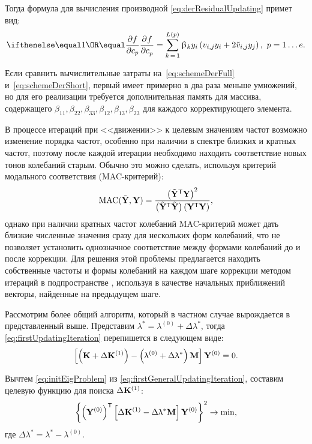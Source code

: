 Тогда формула для вычисления производной \eqref{eq:derResidualUpdating} примет вид:
\begin{equation}
	\partDer{f}{c_p}{} = \sum\limits_{k\,=\,1} ^ {L(p)} \beta_k y_i \rbrackets{v_{i, j} y_i + 2 \tilde{v}_{i, j} y_j}, \ p = 1 \hdots e.
	\label{eq:schemeDerShort}
\end{equation}

Если сравнить вычислительные затраты на~\eqref{eq:schemeDerFull} и~\eqref{eq:schemeDerShort}, первый имеет примерно в два раза меньше умножений, но для его реализации требуется дополнительная память для массива, содержащего $ \beta_{11}, \beta_{22}, \beta_{33}, \beta_{12}, \beta_{13}, \beta_{23} $ для каждого корректирующего элемента. 

В процессе итераций при <<движении>> к целевым значениям частот возможно изменение порядка частот, особенно при наличии в спектре близких и кратных частот, поэтому после каждой итерации необходимо находить соответствие новых тонов колебаний старым. Обычно это можно сделать, используя критерий модального соответствия (MAC-критерий):
\begin{equation}
	\text{MAC}(\tilde{\mathbf{Y}}, \mathbf{Y}) = \frac{\left( \tilde{\mathbf{Y}} ^ \mathsf{T} \mathbf{Y} \right) ^ 2}{\left( \tilde{\mathbf{Y}} ^ \mathsf{T} \tilde{\mathbf{Y}} \right) \left( \mathbf{Y} ^ \mathsf{T} \mathbf{Y} \right)},
	\label{eq:MAC}
\end{equation}
однако при наличии кратных частот колебаний MAC-критерий может дать близкие численные значения сразу для нескольких форм колебаний, что не позволяет установить однозначное соответствие между формами колебаний до и после коррекции. Для решения этой проблемы предлагается находить собственные частоты и формы колебаний на каждом шаге коррекции методом итераций в подпространстве \cite{lib:modelUpdating:Bathe}, используя в качестве начальных приближений векторы, найденные на предыдущем шаге.

Рассмотрим более общий алгоритм, который в частном случае вырождается в представленный выше. Представим $ \lambda ^ \ast = \lambda ^ {(0)} + \Delta \lambda ^ \ast $, тогда \eqref{eq:firstUpdatingIteration} перепишется в следующем виде:
\begin{equation}
	\left[ \left( \mathbf{K} + \Delta \mathbf{K} ^ {(1)} \right) - \left( \uplambda ^ {(0)} + \Delta \uplambda ^ \ast \right) \mathbf{M} \right] \mathbf{Y} ^ {(0)} = 0.
	\label{eq:firstGeneralUpdatingIteration}
\end{equation}

Вычтем \eqref{eq:initEigProblem} из \eqref{eq:firstGeneralUpdatingIteration}, составим целевую функцию для поиска $ \Delta \mathbf{K} ^ {(1)} $:
\begin{equation}
	\left\{ \left( \mathbf{Y}^ {(0)} \right) ^ \mathsf{T} \left[  \Delta \mathbf{K} ^ {(1)} - \Delta \uplambda ^ {\ast} \mathbf{M} \right] \mathbf{Y} ^ {(0)}  \right\} ^ 2 \rightarrow \min,
	\label{eq:objFunGeneralUpdating}
\end{equation}
где $ \Delta \lambda ^ \ast = \lambda ^ \ast - \lambda ^ {(0)}$.

